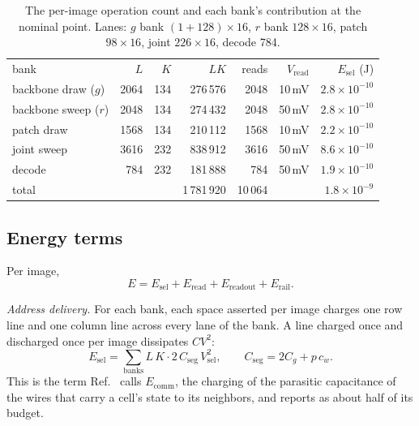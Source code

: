 \documentclass[reprint,amsmath,amssymb,aps,nofootinbib]{revtex4-2}
\begin{document}
\begin{table}
\caption{The per-image operation count and each bank's contribution at the
nominal point. Lanes: $g$ bank $(1 + 128) \times 16$, $r$ bank $128
\times 16$, patch $98 \times 16$, joint $226 \times 16$, decode 784.
\label{tab:app-census}}
\begin{ruledtabular}
\begin{tabular}{lrrrrrr}
bank & $L$ & $K$ & $LK$ & reads & $V_{\mathrm{read}}$ &
  $E_{\mathrm{sel}}$ (J) \\
\colrule
backbone draw ($g$) & 2064 & 134 & 276\,576 & 2048 & 10\,mV & $2.8\times10^{-10}$ \\
backbone sweep ($r$) & 2048 & 134 & 274\,432 & 2048 & 50\,mV & $2.8\times10^{-10}$ \\
patch draw & 1568 & 134 & 210\,112 & 1568 & 10\,mV & $2.2\times10^{-10}$ \\
joint sweep & 3616 & 232 & 838\,912 & 3616 & 50\,mV & $8.6\times10^{-10}$ \\
decode & 784 & 232 & 181\,888 & 784 & 50\,mV & $1.9\times10^{-10}$ \\
\colrule
total & & & 1\,781\,920 & 10\,064 & & $1.8\times10^{-9}$ \\
\end{tabular}
\end{ruledtabular}
\end{table}

\subsection{Energy terms}\label{app:terms}

Per image,
\begin{equation}
E = E_{\mathrm{sel}} + E_{\mathrm{read}} + E_{\mathrm{readout}} +
    E_{\mathrm{rail}} .
\label{eq:app-total}
\end{equation}

\emph{Address delivery.} For each bank, each space asserted per image
charges one row line and one column line across every lane of the bank.
A line charged once and discharged once per image dissipates $C V^2$:
\begin{equation}
E_{\mathrm{sel}} = \sum_{\mathrm{banks}} L\, K \cdot 2\,
  C_{\mathrm{seg}}\, V_{\mathrm{sel}}^2 ,
\qquad C_{\mathrm{seg}} = 2 C_g + p\, c_w .
\label{eq:app-sel}
\end{equation}
This is the term Ref.~\cite{jelincic2025dtm} calls $E_{\mathrm{comm}}$,
the charging of the parasitic capacitance of the wires that carry a
cell's state to its neighbors, and reports as about half of its budget.
\end{document}
